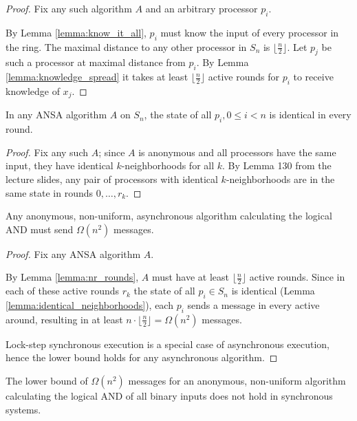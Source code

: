 \begin{proof}
Fix any such algorithm $A$ and an arbitrary processor $p_i$.

By Lemma \ref{lemma:know_it_all}, $p_i$ must know the input of every processor
in the ring. The maximal distance to any other processor in $S_n$ is
$\lfloor \frac{n}{2} \rfloor$. Let $p_j$ be such a processor at maximal distance
from $p_i$. By Lemma \ref{lemma:knowledge_spread}
it takes at least $\lfloor \frac{n}{2} \rfloor$ active rounds for $p_i$ to receive
knowledge of $x_j$.
\end{proof}

\begin{lemma} \label{lemma:identical_neighborhoods}
In any ANSA algorithm $A$ on $S_n$, the state of all $p_i, 0 \leq i < n$ is
identical in every round.
\end{lemma}

\begin{proof}
Fix any such $A$; since $A$ is anonymous and all processors have the same input,
they have identical $k$-neighborhoods for all $k$. By Lemma 130 from the lecture
slides, any pair of processors with identical $k$-neighborhoods are in the
same state in rounds $0, \ldots, r_k$.
\end{proof}

\begin{theorem} \label{theorem:and_lower_bound}
Any anonymous, non-uniform, asynchronous algorithm calculating the logical AND
must send $\Omega(n^2)$ messages.
\end{theorem}

\begin{proof}
Fix any ANSA algorithm $A$.

By Lemma \ref{lemma:nr_rounds}, $A$ must have at least $\lfloor \frac{n}{2} \rfloor$
active rounds. Since in each of these active rounds $r_k$ the state of all
$p_i \in S_n$ is identical (Lemma \ref{lemma:identical_neighborhoods}),
each $p_i$ sends a message in every active around, resulting in at least
$n \cdot \lfloor \frac{n}{2} \rfloor = \Omega(n^2)$ messages.

Lock-step synchronous execution
is a special case of asynchronous execution, hence the lower bound holds for
any asynchronous algorithm.
\end{proof}


\begin{theorem}
The lower bound of $\Omega(n^2)$ messages for an anonymous, non-uniform algorithm calculating the
logical AND of all binary inputs does not hold in synchronous systems.
\end{theorem}

